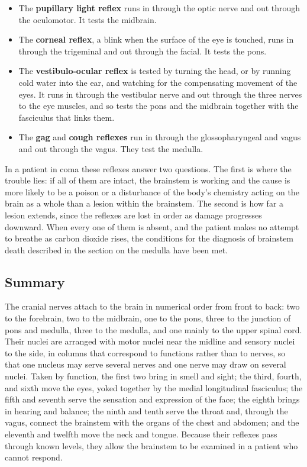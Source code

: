 \documentclass[11pt]{article}
\begin{document}
\begin{itemize}
    \item The \textbf{pupillary light reflex} runs in through the optic nerve and out through the oculomotor. It tests the midbrain.
    \item The \textbf{corneal reflex}, a blink when the surface of the eye is touched, runs in through the trigeminal and out through the facial. It tests the pons.
    \item The \textbf{vestibulo-ocular reflex} is tested by turning the head, or by running cold water into the ear, and watching for the compensating movement of the eyes. It runs in through the vestibular nerve and out through the three nerves to the eye muscles, and so tests the pons and the midbrain together with the fasciculus that links them.
    \item The \textbf{gag} and \textbf{cough reflexes} run in through the glossopharyngeal and vagus and out through the vagus. They test the medulla.
\end{itemize}

In a patient in coma these reflexes answer two questions. The first is where the trouble lies: if all of them are intact, the brainstem is working and the cause is more likely to be a poison or a disturbance of the body's chemistry acting on the brain as a whole than a lesion within the brainstem. The second is how far a lesion extends, since the reflexes are lost in order as damage progresses downward. When every one of them is absent, and the patient makes no attempt to breathe as carbon dioxide rises, the conditions for the diagnosis of brainstem death described in the section on the medulla have been met.

\subsection{Summary}

The cranial nerves attach to the brain in numerical order from front to back: two to the forebrain, two to the midbrain, one to the pons, three to the junction of pons and medulla, three to the medulla, and one mainly to the upper spinal cord. Their nuclei are arranged with motor nuclei near the midline and sensory nuclei to the side, in columns that correspond to functions rather than to nerves, so that one nucleus may serve several nerves and one nerve may draw on several nuclei. Taken by function, the first two bring in smell and sight; the third, fourth, and sixth move the eyes, yoked together by the medial longitudinal fasciculus; the fifth and seventh serve the sensation and expression of the face; the eighth brings in hearing and balance; the ninth and tenth serve the throat and, through the vagus, connect the brainstem with the organs of the chest and abdomen; and the eleventh and twelfth move the neck and tongue. Because their reflexes pass through known levels, they allow the brainstem to be examined in a patient who cannot respond.
\end{document}
